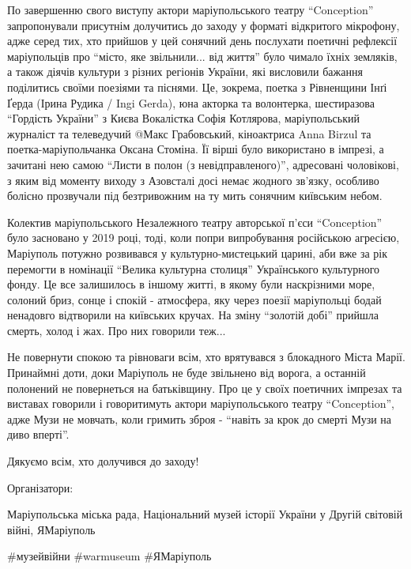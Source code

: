 По завершенню свого виступу актори маріупольського театру \enquote{Conception}
запропонували присутнім долучитись до заходу у форматі відкритого мікрофону,
адже серед тих, хто прийшов у цей сонячний день послухати поетичні рефлексії
маріупольців про \enquote{місто, яке звільнили... від життя} було чимало їхніх земляків,
а також діячів культури з різних регіонів України, які висловили бажання
поділитись своїми поезіями та піснями. Це, зокрема, поетка з Рівненщини Інґі
Ґерда (Ірина Рудика / Ingi Gerda), юна акторка та волонтерка, шестиразова
\enquote{Гордість України} з Києва Вокалістка Софія Котлярова, маріупольський журналіст
та телеведучий @Макс Грабовський, кіноактриса Anna Birzul та
поетка-маріупольчанка Оксана Стоміна. Її вірші було використано в імпрезі, а
зачитані нею самою \enquote{Листи в полон (з невідправленого)}, адресовані чоловікові,
з яким від моменту виходу з Азовсталі досі немає жодного зв’язку, особливо
болісно прозвучали під безтривожним на ту мить сонячним київським небом.

Колектив маріупольського Незалежного театру авторської п'єси \enquote{Conception} було
засновано у 2019 році, тоді, коли попри випробування російською агресією,
Маріуполь потужно розвивався у культурно-мистецький царині, аби вже за рік
перемогти в номінації \enquote{Велика культурна столиця} Українського культурного
фонду. Це все залишилось в іншому житті, в якому були наскрізними море, солоний
бриз, сонце і спокій - атмосфера, яку через поезії маріупольці бодай ненадовго
відтворили на київських кручах. На зміну \enquote{золотій добі} прийшла смерть, холод і
жах. Про них говорили теж... 

Не повернути спокою та рівноваги всім, хто врятувався з блокадного Міста Марії.
Принаймні доти, доки Маріуполь не буде звільнено від ворога, а останній
полонений не повернеться на батьківщину. Про це у своїх поетичних імпрезах та
виставах говорили і говоритимуть актори маріупольського театру \enquote{Conception},
адже Музи не мовчать, коли гримить зброя - \enquote{навіть за крок до смерті Музи на
диво вперті}.

Дякуємо всім, хто долучився до заходу!

Організатори: 

Маріупольська міська рада, 
Національний музей історії України у Другій світовій війні, 
ЯМаріуполь

\#музейвійни \#warmuseum \#ЯМаріуполь
